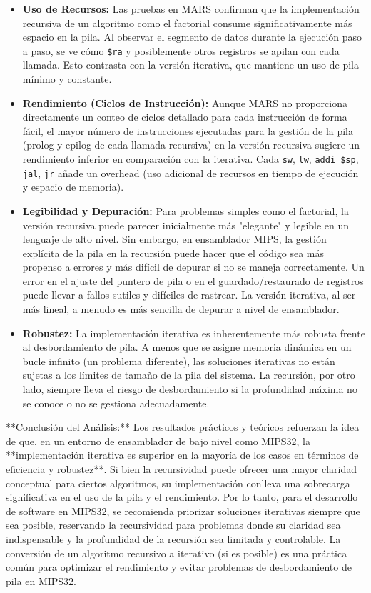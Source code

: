 \documentclass{article}
\begin{document}
\begin{itemize}
    \item \textbf{Uso de Recursos:} Las pruebas en MARS confirman que la implementación recursiva de un algoritmo como el factorial consume significativamente más espacio en la pila. Al observar el segmento de datos durante la ejecución paso a paso, se ve cómo \texttt{\$ra} y posiblemente otros registros se apilan con cada llamada. Esto contrasta con la versión iterativa, que mantiene un uso de pila mínimo y constante.
    \item \textbf{Rendimiento (Ciclos de Instrucción):} Aunque MARS no proporciona directamente un conteo de ciclos detallado para cada instrucción de forma fácil, el mayor número de instrucciones ejecutadas para la gestión de la pila (prolog y epilog de cada llamada recursiva) en la versión recursiva sugiere un rendimiento inferior en comparación con la iterativa. Cada \texttt{sw}, \texttt{lw}, \texttt{addi \$sp}, \texttt{jal}, \texttt{jr} añade un overhead (uso adicional de recursos en tiempo de ejecución y espacio de memoria).
    \item \textbf{Legibilidad y Depuración:} Para problemas simples como el factorial, la versión recursiva puede parecer inicialmente más "elegante" y legible en un lenguaje de alto nivel. Sin embargo, en ensamblador MIPS, la gestión explícita de la pila en la recursión puede hacer que el código sea más propenso a errores y más difícil de depurar si no se maneja correctamente. Un error en el ajuste del puntero de pila o en el guardado/restaurado de registros puede llevar a fallos sutiles y difíciles de rastrear. La versión iterativa, al ser más lineal, a menudo es más sencilla de depurar a nivel de ensamblador.
    \item \textbf{Robustez:} La implementación iterativa es inherentemente más robusta frente al desbordamiento de pila. A menos que se asigne memoria dinámica en un bucle infinito (un problema diferente), las soluciones iterativas no están sujetas a los límites de tamaño de la pila del sistema. La recursión, por otro lado, siempre lleva el riesgo de desbordamiento si la profundidad máxima no se conoce o no se gestiona adecuadamente.
\end{itemize}

**Conclusión del Análisis:**
Los resultados prácticos y teóricos refuerzan la idea de que, en un entorno de ensamblador de bajo nivel como MIPS32, la **implementación iterativa es superior en la mayoría de los casos en términos de eficiencia y robustez**. Si bien la recursividad puede ofrecer una mayor claridad conceptual para ciertos algoritmos, su implementación conlleva una sobrecarga significativa en el uso de la pila y el rendimiento. Por lo tanto, para el desarrollo de software en MIPS32, se recomienda priorizar soluciones iterativas siempre que sea posible, reservando la recursividad para problemas donde su claridad sea indispensable y la profundidad de la recursión sea limitada y controlable. La conversión de un algoritmo recursivo a iterativo (si es posible) es una práctica común para optimizar el rendimiento y evitar problemas de desbordamiento de pila en MIPS32.
\end{document}
